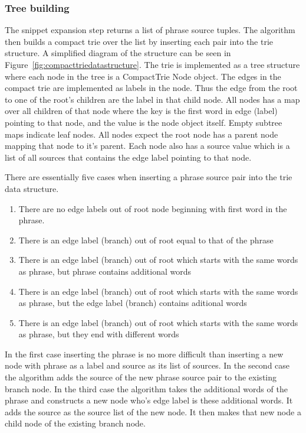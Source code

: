 \subsubsection{Tree building}
The snippet expansion step returns a list of phrase source tuples. The algorithm then builds a compact trie over the list by inserting each pair into the trie structure. A simplified diagram of the structure can be seen in Figure~\ref{fig:compacttriedatastructure}. The trie is implemented as a tree structure where each node in the tree is a CompactTrie Node object. The edges in the compact trie are implemented as labels in the node. Thus the edge from the root to one of the root's children are the label in that child node. All nodes has a map over all children of that node where the key is the first word in edge (label) pointing to that node, and the value is the node object itself. Empty subtree maps indicate leaf nodes. All nodes expect the root node has a parent node mapping that node to it's parent. Each node also has a source value which is a list of all sources that contains the edge label pointing to that node.

There are essentially five cases when inserting a phrase source pair into the trie data structure.
\begin{enumerate}
  \item There are no edge labels out of root node beginning with first word in the phrase.
  \item There is an edge label (branch) out of root equal to that of the phrase
  \item There is an edge label (branch) out of root which starts with the same words as phrase, but phrase contains additional words
  \item There is an edge label (branch) out of root which starts with the same words as phrase, but the edge label (branch) contains aditional words
  \item There is an edge label (branch) out of root which starts with the same words as phrase, but they end with different words
\end{enumerate}
In the first case inserting the phrase is no more difficult than inserting a new node with phrase as a label and source as its list of sources. In the second case the algorithm adds the source of the new phrase source pair to the existing branch node. In the third case the algorithm takes the additional words of the phrase and constructs a new node who's edge label is these additional words. It adds the source as the source list of the new node. It then makes that new node a child node of the existing branch node.

